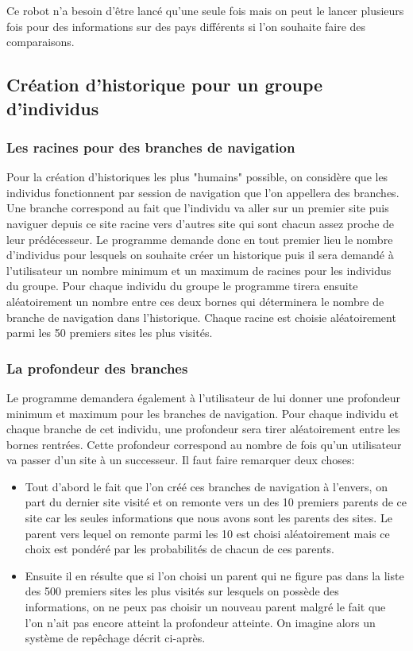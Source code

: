 \documentclass[a4paper, 11pt]{article}
\begin{document}
Ce robot n'a besoin d'être lancé qu'une seule fois mais on peut le lancer plusieurs fois pour des informations sur des pays différents si l'on souhaite faire des comparaisons.


\subsection{Création d'historique pour un groupe d'individus}
\subsubsection{Les racines pour des branches de navigation}
Pour la création d'historiques les plus "humains" possible, on considère que les individus fonctionnent par session de navigation que l'on appellera des branches. Une branche correspond au fait que l'individu va aller sur un premier site puis naviguer depuis ce site racine vers d'autres site qui sont chacun assez proche de leur prédécesseur. Le programme demande donc en tout premier lieu le nombre d'individus pour lesquels on souhaite créer un historique puis il sera demandé à l'utilisateur un nombre minimum et un maximum de racines pour les individus du groupe. Pour chaque individu du groupe le programme tirera ensuite aléatoirement un nombre entre ces deux bornes qui déterminera le nombre de branche de navigation dans l'historique.
Chaque racine est choisie aléatoirement parmi les 50 premiers sites les plus visités.

\subsubsection{La profondeur des branches}

Le programme demandera également à l'utilisateur de lui donner une profondeur minimum et maximum pour les branches de navigation. Pour chaque individu et chaque branche de cet individu, une profondeur sera tirer aléatoirement entre les bornes rentrées. Cette profondeur correspond au nombre de fois qu'un utilisateur va passer d'un site à un successeur. Il faut faire remarquer deux choses: 
\begin{itemize}
\item Tout d'abord le fait que l'on créé ces branches de navigation à l'envers, on part du dernier site visité et on remonte vers un des 10 premiers parents de ce site car les seules informations que nous avons sont les parents des sites. Le parent vers lequel on remonte parmi les 10 est choisi aléatoirement mais ce choix est pondéré par les probabilités de chacun de ces parents.
\item Ensuite il en résulte que si l'on choisi un parent qui ne figure pas dans la liste des 500 premiers sites les plus visités sur lesquels on possède des informations, on ne peux pas choisir un nouveau parent malgré le fait que l'on n'ait pas encore atteint la profondeur atteinte. On imagine alors un système de repêchage décrit ci-après.
\end{itemize}
\end{document}
